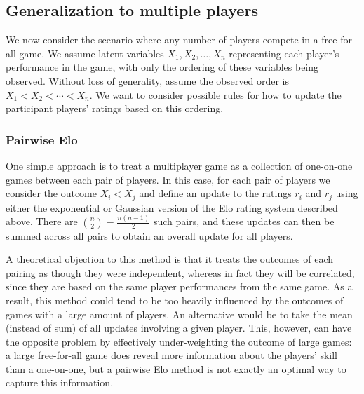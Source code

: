 \documentclass{article}
\begin{document}
	\subsection{Generalization to multiple players}
	\label{sec:multiplayer}
	We now consider the scenario where any number of players compete in a free-for-all game. We assume latent variables
	$X_1, X_2, \dots, X_n$ representing each player's performance in the game, with only the ordering of these variables
	being observed. Without loss of generality, assume the observed order is $X_1 < X_2 < \cdots < X_n$. We want to consider
	possible rules for how to update the participant players' ratings based on this ordering.
	
	\subsubsection{Pairwise Elo}
	One simple approach is to treat a multiplayer game as a collection of one-on-one games between each pair of players.
	In this case, for each pair of players we consider the outcome $X_i < X_j$ and define an update to the ratings $r_i$ and $r_j$
	using either the exponential or Gaussian version of the Elo rating system described above. There are $\binom{n}2 = \frac{n(n-1)}2$
	such pairs, and these updates can then be summed across all pairs to obtain an overall update for all players.
	
	A theoretical objection to this method is that it treats the outcomes of each pairing as though they were independent, whereas
	in fact they will be correlated, since they are based on the same player performances from the same game. As a result,
	this method could tend to be too heavily influenced by the outcomes of games with a large amount of players.
	An alternative would be to take the mean (instead of sum) of all updates involving a given player. This, however, can have the opposite 
	problem by effectively under-weighting the outcome of large games: a large free-for-all game does reveal more information about
	the players' skill than a one-on-one, but a pairwise Elo method is not exactly an optimal way to capture this information.
	
\end{document}
